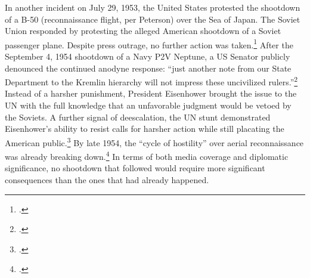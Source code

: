 \documentclass[12pt]{extarticle}
\begin{document}
In another incident on July 29, 1953, the United States protested the shootdown of a B-50 (reconnaissance flight, per Peterson) over the Sea of Japan. The Soviet Union responded by protesting the alleged American shootdown of a Soviet passenger plane. Despite press outrage, no further action was taken.\footcite[47]{farquhar_aerial_2015} After the September 4, 1954 shootdown of a Navy P2V Neptune, a US Senator publicly denounced the continued anodyne response: \enquote{just another note from our State Department to the Kremlin hierarchy will not impress these uncivilized rulers.}\footcite{the_associated_press_ending_1954} Instead of a harsher punishment, President Eisenhower brought the issue to the UN with the full knowledge that an unfavorable judgment would be vetoed by the Soviets. A further signal of deescalation, the UN stunt demonstrated Eisenhower's ability to resist calls for harsher action while still placating the American public.\footcite[47]{farquhar_aerial_2015} By late 1954, the \enquote{cycle of hostility} over aerial reconnaissance was already breaking down.\footcite[49]{farquhar_aerial_2015} In terms of both media coverage and diplomatic significance, no shootdown that followed would require more significant consequences than the ones that had already happened.
\end{document}
